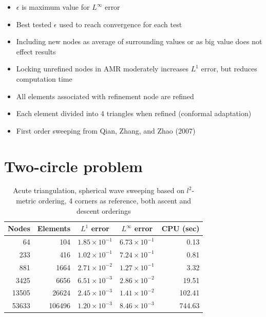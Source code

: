 \documentclass[11pt]{article}
\begin{document}
\begin{itemize}
\item $\epsilon$ is maximum value for $L^\infty$ error
\item Best tested $\epsilon$ used to reach convergence for each test
\item Including new nodes as average of surrounding values or as big value does not effect results
\item Locking unrefined nodes in AMR moderately increases $L^1$ error, but reduces computation time
\item All elements associated with refinement node are refined
\item Each element divided into 4 triangles when refined (conformal adaptation)
\item First order sweeping from Qian, Zhang, and Zhao (2007)
\end{itemize}

\section*{Two-circle problem}

\begin{table}[h!]
\begin{center}
\begin{tabular}{|r|r|c|c|r|}
\hline
Nodes & Elements & $L^1$ error & $L^\infty$ error & CPU (sec) \\
\hline
64 & 104 & $1.85 \times 10^{-1}$ & $6.73 \times 10^{-1}$ & 0.13 \\
233 & 416 & $1.02 \times 10^{-1}$ & $7.24 \times 10^{-1}$ & 0.81 \\
881 & 1664 & $2.71 \times 10^{-2}$ & $1.27 \times 10^{-1}$ & 3.32 \\
3425 & 6656 & $6.51 \times 10^{-3}$ & $2.86 \times 10^{-2}$ & 19.51 \\
13505 & 26624 & $2.45 \times 10^{-3}$ & $1.41 \times 10^{-2}$ & 102.41 \\
53633 & 106496 & $1.20 \times 10^{-3}$ & $8.46 \times 10^{-3}$ & 744.63 \\
\hline
\end{tabular}
\end{center}
\caption{Acute triangulation, spherical wave sweeping based on $l^2$-metric ordering, 4 corners as reference, both ascent and descent orderings}
\end{table}
\end{document}
